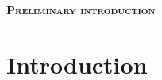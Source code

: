 \documentclass[usletter, 12pt]{article}
\begin{document}
	
	\begin{center}
		\Large \textsc{\textbf{Preliminary introduction}}\\
	\end{center}
	
	
	\newpage
	
	\section{Introduction}
			 	 		
		
		
			
	\newpage
	

	
	
	
	
	
	
	
		
\end{document}
